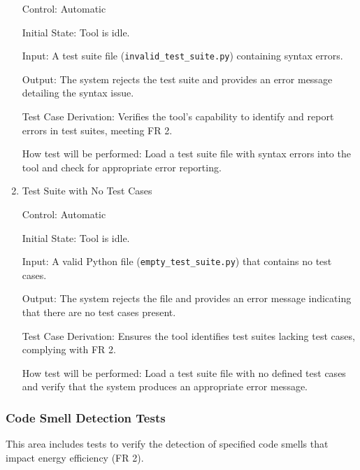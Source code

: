 \documentclass[12pt, titlepage]{article}
\begin{document}
\begin{enumerate}
    Control: Automatic

    Initial State: Tool is idle.

    Input: A test suite file (\texttt{invalid\_test\_suite.py}) containing syntax errors.

    Output: The system rejects the test suite and provides an error message detailing the syntax issue.

    Test Case Derivation: Verifies the tool's capability to identify and report errors in test suites, meeting FR 2.

    How test will be performed: Load a test suite file with syntax errors into the tool and check for appropriate error reporting.

    \item{Test Suite with No Test Cases\\}

    Control: Automatic

    Initial State: Tool is idle.

    Input: A valid Python file (\texttt{empty\_test\_suite.py}) that contains no test cases.

    Output: The system rejects the file and provides an error message indicating that there are no test cases present.

    Test Case Derivation: Ensures the tool identifies test suites lacking test cases, complying with FR 2.

    How test will be performed: Load a test suite file with no defined test cases and verify that the system produces an appropriate error message.


\end{enumerate}


\subsubsection{Code Smell Detection Tests}

This area includes tests to verify the detection of specified code 
smells that impact energy efficiency (FR 2).
		
\end{document}
